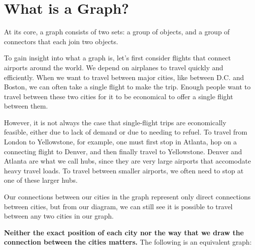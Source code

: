 \documentclass[11pt]{article}
\begin{document}
\section{What is a Graph?}

At its core, a graph consists of two sets: a group of objects, and a group of connectors that each join two objects.

To gain insight into what a graph is, let's first consider flights that connect airports around the world.
We depend on airplanes to travel quickly and efficiently. When we want to travel between major cities,
like between D.C. and Boston, we can often take a single flight to make the trip. Enough people want to travel between
these two cities for it to be economical to offer a single flight between them.

However, it is not always the case that single-flight trips are economically feasible, either due to lack of demand
or due to needing to refuel. To travel from London to Yellowstone, for example, one must first stop in Atlanta, hop
on a connecting flight to Denver, and then finally travel to Yellowstone. Denver and Atlanta are what we call
hubs, since they are very large airports that accomodate heavy travel loads. To travel between smaller airports, we often
need to stop at one of these larger hubs.

\begin{center}
\end{center}

Our connections between our cities in the graph represent only direct connections between
cities, but from our diagram, we can still see it is possible to travel between any two
cities in our graph.

\textbf{Neither the exact position of each city nor the way that we draw the connection between the cities
matters.} The following is an equivalent graph:
\end{document}
